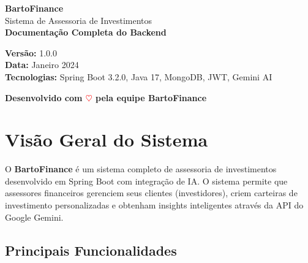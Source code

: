 \documentclass[12pt,a4paper]{article}
\begin{document}
\begin{titlepage}
    \centering
    \vspace*{2cm}
    
    {\Huge\bfseries\color{primaryblue} BartoFinance}\\[0.5cm]
    {\Large Sistema de Assessoria de Investimentos}\\[1cm]
    
    {\huge\bfseries Documentação Completa do Backend}\\[2cm]
    
    \begin{infobox}
        \centering
        \textbf{Versão:} 1.0.0\\
        \textbf{Data:} Janeiro 2024\\
        \textbf{Tecnologias:} Spring Boot 3.2.0, Java 17, MongoDB, JWT, Gemini AI
    \end{infobox}
    
    \vfill
    
    \begin{center}
        \textbf{Desenvolvido com \textcolor{red}{$\heartsuit$} pela equipe BartoFinance}
    \end{center}
    
    \vspace{1cm}
\end{titlepage}

\tableofcontents
\newpage

\section{Visão Geral do Sistema}

O \textbf{BartoFinance} é um sistema completo de assessoria de investimentos desenvolvido em Spring Boot com integração de IA. O sistema permite que assessores financeiros gerenciem seus clientes (investidores), criem carteiras de investimento personalizadas e obtenham insights inteligentes através da API do Google Gemini.

\subsection{Principais Funcionalidades}
\end{document}
